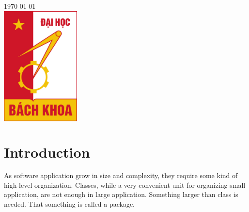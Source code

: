 \documentclass[12pt]{report}
\begin{document}
\begin{titlepage}


{\large \today}\\[1cm] %


\includegraphics[width=4cm]{hust.jpg}\\[1cm] %
 

\vfill %

\end{titlepage}

\tableofcontents 
\newpage

\newpage
\setcounter{page}{1}

\section*{Introduction}
As software application grow in size and complexity, 
they require some kind of high-level organization.
Classes, while a very convenient unit for organizing small application,
are not enough in large application. 
Something larger than class is needed.
That something is called a package. 
\end{document}
